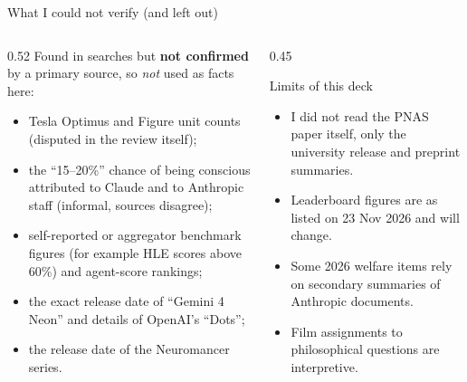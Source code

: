 \begin{frame}{What I could not verify (and left out)}
\begin{columns}[T]
\begin{column}{0.52\textwidth}
\small
Found in searches but \textbf{not confirmed} by a primary source, so \emph{not} used as facts here:
\begin{itemize}\setlength\itemsep{2pt}
\item Tesla Optimus and Figure unit counts (disputed in the review itself);
\item the ``15--20\%'' chance of being conscious attributed to Claude and to Anthropic staff (informal, sources disagree);
\item self-reported or aggregator benchmark figures (for example HLE scores above 60\%) and agent-score rankings;
\item the exact release date of ``Gemini 4 Neon'' and details of OpenAI's ``Dots'';
\item the release date of the Neuromancer series.
\end{itemize}
\end{column}
\begin{column}{0.45\textwidth}
\begin{block}{Limits of this deck}
{\small
\begin{itemize}\setlength\itemsep{2pt}
\item I did not read the PNAS paper itself, only the university release and preprint summaries.
\item Leaderboard figures are as listed on 23 Nov 2026 and will change.
\item Some 2026 welfare items rely on secondary summaries of Anthropic documents.
\item Film assignments to philosophical questions are interpretive.
\end{itemize}}
\end{block}
\end{column}
\end{columns}
\end{frame}
